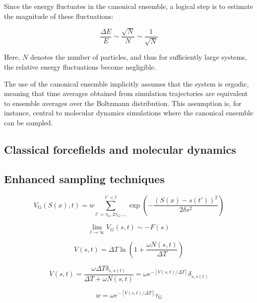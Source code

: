 Since the energy fluctuates in the canonical ensemble, a logical step is to estimate the magnitude of these fluctuations:

\begin{equation}
    \frac{\Delta E}{E} \sim \frac{\sqrt{N}}{N} \sim \frac{1}{\sqrt{N}}
\end{equation}

Here, $N$ denotes the number of particles, and thus for sufficiently large systems, the relative energy fluctuations become negligible.

The use of the canonical ensemble implicitly assumes that the system is ergodic, meaning that time averages obtained from simulation trajectories are equivalent to ensemble averages over the Boltzmann distribution. This assumption is, for instance, central to molecular dynamics simulations where the canonical ensemble can be sampled.

\subsection{Classical forcefields and molecular dynamics}

\subsection{Enhanced sampling techniques}

\begin{equation}
V_{\text{G}}(S(x), t) = w \sum_{t' = \tau_{\text{G}}, 2\tau_{\text{G}}, \ldots}^{t' < t} \exp\left(-\frac{(S(x) - s(t'))^2}{2\delta s^2}\right)
\label{eq:biasing_potential}
\end{equation}

\begin{equation}
\label{eq:free_energy_from_metadynamics}
\lim_{t \to \infty} V_G(s,t) \sim -F(s)
\end{equation}

\begin{equation}
V(s, t) = \Delta T \ln\left(1 + \frac{\omega N(s, t)}{\Delta T}\right)
\label{eq:history_dependant_potential}
\end{equation}

\begin{equation}
\label{eq:hill_deposition_rate}
\dot{V}(s,t) = \frac{\omega \Delta T \delta_{s,s(t)}}{\Delta T + \omega N(s,t)} 
= \omega e^{-[V(s,t)/\Delta T]} \delta_{s,s(t)}
\end{equation}

\begin{equation}
w = \omega e^{-[V(s,t)/\Delta T]} \tau_{\text{G}}
\label{eq:hill_height}
\end{equation}

